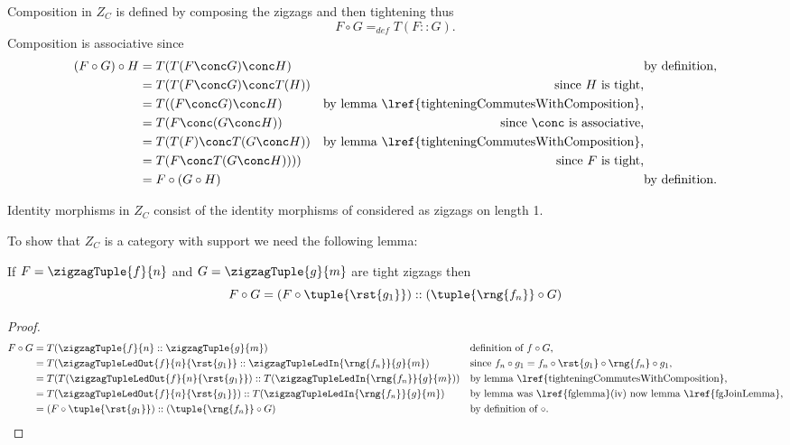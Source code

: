 Composition in $Z_C$ is defined by composing the zigzags and then tightening  thus
\[
F \circ G =_{def} T(F :: G).
\]
Composition is associative since 
\begin{align*}
(F \circ G) \circ H 
                &= T(T(F \conc G) \conc H) &&   \mbox{by definition,} \\
                &= T(T(F \conc G) \conc T(H))
                        &\mbox{since $H$ is tight,}\\
                &= T((F \conc G) \conc H)  
                        &\mbox{by lemma \lref{tighteningCommutesWithComposition},}\\
                &= T(F \conc (G \conc H))
                        &\mbox {since $\conc$ is associative,} \\
                &= T(T(F) \conc T(G \conc H))       
                        &\mbox{by lemma \lref{tighteningCommutesWithComposition},}\\
                &= T(F \conc T(G \conc H))))
                        &\mbox{since $F$ is tight,} \\
                &= F \circ (G \circ H) &&   \mbox{by definition.}                 
\end{align*}

Identity morphisms in $Z_C$ consist of the identity morphisms of \catcw considered 
as zigzags on length 1.

To show that $Z_C$ is a category with support we need the following lemma:
\begin{lemma}
If $F=\zigzagTuple{f}{n}$ and $G=\zigzagTuple{g}{m}$ are tight zigzags
then 
\[
F \circ G = (F \circ \tuple{\rst{g_1}}) :: (\tuple{\rng{f_n}} \circ G)
\]
\end{lemma}
\begin{proof}
\begin{align*}
F \circ G &= T(\zigzagTuple{f}{n}::\zigzagTuple{g}{m})
           &&\mbox{definition of $f \circ G$,}\\
          &= T(\zigzagTupleLedOut{f}{n}{\rst{g_1}} :: \zigzagTupleLedIn{\rng{f_n}}{g}{m} )
          && \mbox{since $f_n \circ g_1 = f_n \circ \rst{g_1} \circ \rng{f_n} \circ g_1$,} \\
          &=  T(T(\zigzagTupleLedOut{f}{n}{\rst{g_1}}) :: 
                           T(\zigzagTupleLedIn{\rng{f_n}}{g}{m}) )
          && \mbox{by lemma \lref{tighteningCommutesWithComposition},}\\
          &= T(\zigzagTupleLedOut{f}{n}{\rst{g_1}}) :: 
                           T(\zigzagTupleLedIn{\rng{f_n}}{g}{m}) 
          && \mbox{by lemma was \lref{fglemma}(iv)
                        now lemma \lref{fgJoinLemma},}\\
          &= (F \circ \tuple{\rst{g_1}}) :: (\tuple{\rng{f_n}} \circ G)
          && \mbox{by definition of $\circ$.}
\end{align*}
\end{proof}


